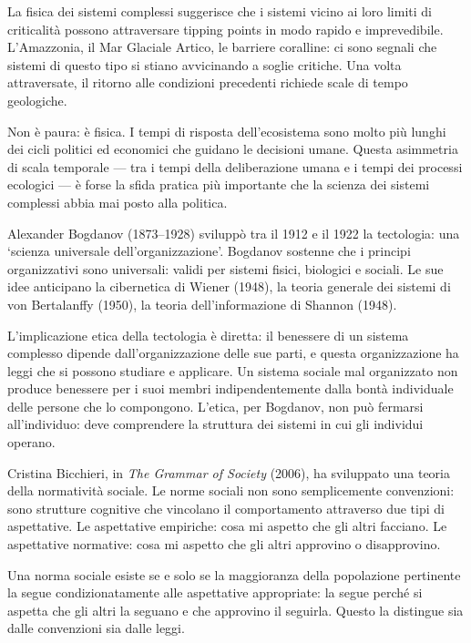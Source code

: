 \documentclass[12pt,a4paper,openany]{book}
\newcommand{\sezione}[1]{\vspace{1.2em}{\large\bfseries #1}\vspace{0.5em}\par}
\begin{document}
La fisica dei sistemi complessi suggerisce che i sistemi vicino ai loro limiti di criticalità possono attraversare tipping points in modo rapido e imprevedibile. L'Amazzonia, il Mar Glaciale Artico, le barriere coralline: ci sono segnali che sistemi di questo tipo si stiano avvicinando a soglie critiche. Una volta attraversate, il ritorno alle condizioni precedenti richiede scale di tempo geologiche.

Non è paura: è fisica. I tempi di risposta dell'ecosistema sono molto più lunghi dei cicli politici ed economici che guidano le decisioni umane. Questa asimmetria di scala temporale --- tra i tempi della deliberazione umana e i tempi dei processi ecologici --- è forse la sfida pratica più importante che la scienza dei sistemi complessi abbia mai posto alla politica.

\sezione{Bogdanov e la tectologia}

Alexander Bogdanov (1873--1928) sviluppò tra il 1912 e il 1922 la tectologia: una `scienza universale dell'organizzazione'. Bogdanov sostenne che i principi organizzativi sono universali: validi per sistemi fisici, biologici e sociali. Le sue idee anticipano la cibernetica di Wiener (1948), la teoria generale dei sistemi di von Bertalanffy (1950), la teoria dell'informazione di Shannon (1948).

L'implicazione etica della tectologia è diretta: il benessere di un sistema complesso dipende dall'organizzazione delle sue parti, e questa organizzazione ha leggi che si possono studiare e applicare. Un sistema sociale mal organizzato non produce benessere per i suoi membri indipendentemente dalla bontà individuale delle persone che lo compongono. L'etica, per Bogdanov, non può fermarsi all'individuo: deve comprendere la struttura dei sistemi in cui gli individui operano.

\sezione{Bicchieri e le norme sociali}

Cristina Bicchieri, in \textit{The Grammar of Society} (2006), ha sviluppato una teoria della normatività sociale. Le norme sociali non sono semplicemente convenzioni: sono strutture cognitive che vincolano il comportamento attraverso due tipi di aspettative. Le aspettative empiriche: cosa mi aspetto che gli altri facciano. Le aspettative normative: cosa mi aspetto che gli altri approvino o disapprovino.

Una norma sociale esiste se e solo se la maggioranza della popolazione pertinente la segue condizionatamente alle aspettative appropriate: la segue perché si aspetta che gli altri la seguano e che approvino il seguirla. Questo la distingue sia dalle convenzioni sia dalle leggi.
\end{document}
